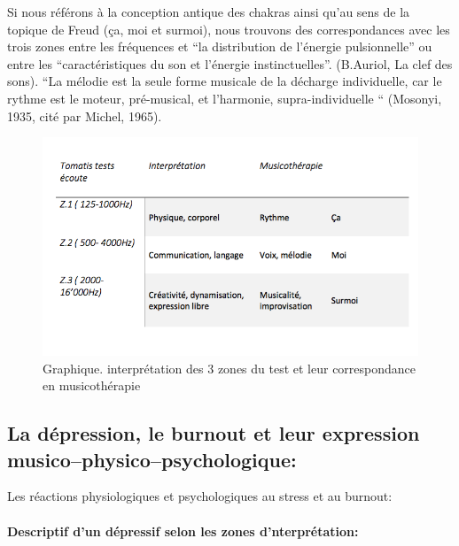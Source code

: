 Si nous référons à la conception antique des chakras ainsi qu'au sens de la
topique de Freud (ça, moi et surmoi), nous trouvons des correspondances
avec les trois zones entre les
fréquences et ``la distribution de l'énergie pulsionnelle'' ou entre
les 
``caractéristiques du son et l'énergie instinctuelles''. (B.Auriol, La
clef des sons).
``La mélodie est la seule forme musicale de la décharge individuelle, car le rythme est le moteur, pré-musical, et l'harmonie, supra-individuelle `` (Mosonyi, 1935, cité par Michel, 1965).

 

\begin{figure}
	\centering
	\includegraphics[width=0.7\linewidth]{images/testinterpmusico}
	\caption[ L'interprétation des 3 zones et leur correspondance
        en musicothérapie]{Graphique. interprétation des 3 zones du
          test et leur correspondance en musicothérapie}
       
	\label{graphiquecolonnetestmusico}
      \end{figure}











      


      \subsection{La dépression, le burnout et leur expression musico--physico--psychologique:}

Les réactions physiologiques et psychologiques au stress et au burnout:
 
\paragraph{Descriptif d'un dépressif selon les zones d'nterprétation:}



